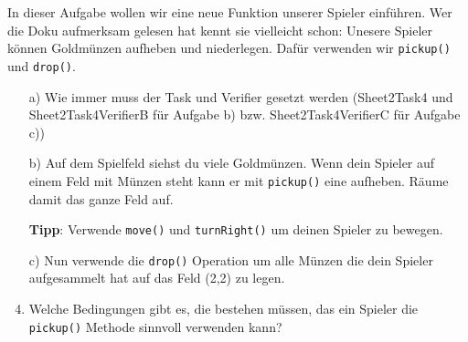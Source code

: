 In dieser Aufgabe wollen wir eine neue Funktion unserer Spieler einführen. 
Wer die Doku aufmerksam gelesen hat kennt sie vielleicht schon: 
Unesere Spieler können Goldmünzen aufheben und niederlegen. 
Dafür verwenden wir \lstinline{pickup()} und \lstinline{drop()}.

\begin{enumerate}
    \item[a)] Wie immer muss der Task und Verifier gesetzt werden (Sheet2Task4 und Sheet2Task4VerifierB für Aufgabe b) bzw. Sheet2Task4VerifierC für Aufgabe c))
    \item[b)] Auf dem Spielfeld siehst du viele Goldmünzen.
    Wenn dein Spieler auf einem Feld mit Münzen steht kann er mit \lstinline{pickup()} eine aufheben.
    Räume damit das ganze Feld auf.
    
    \textbf{Tipp}: Verwende \lstinline{move()} und \lstinline{turnRight()} um deinen Spieler zu bewegen.

    \item[c)] Nun verwende die \lstinline{drop()} Operation um alle Münzen die dein Spieler aufgesammelt hat auf das Feld (2,2) zu legen.
    \item[d)] Welche Bedingungen gibt es, die bestehen müssen, das ein Spieler die \lstinline{pickup()} Methode sinnvoll verwenden kann? 
\end{enumerate}